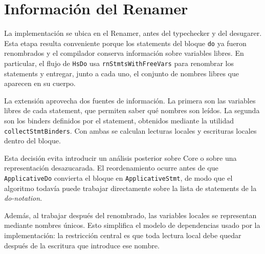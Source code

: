
\section{Información del Renamer}

La implementación se ubica en el Renamer, antes del typechecker y del desugarer. Esta etapa resulta conveniente porque los statements del bloque \texttt{do} ya fueron renombrados y el compilador conserva información sobre variables libres. En particular, el flujo de \texttt{HsDo} usa \texttt{rnStmtsWithFreeVars} para renombrar los statements y entregar, junto a cada uno, el conjunto de nombres libres que aparecen en su cuerpo.

La extensión aprovecha dos fuentes de información. La primera son las variables libres de cada statement, que permiten saber qué nombres son leídos. La segunda son los binders definidos por el statement, obtenidos mediante la utilidad \texttt{collectStmtBinders}. Con ambas se calculan lecturas locales y escrituras locales dentro del bloque.

Esta decisión evita introducir un análisis posterior sobre Core o sobre una representación desazucarada. El reordenamiento ocurre antes de que \texttt{ApplicativeDo} convierta el bloque en \texttt{ApplicativeStmt}, de modo que el algoritmo todavía puede trabajar directamente sobre la lista de statements de la \textit{do-notation}.

Además, al trabajar después del renombrado, las variables locales se representan mediante nombres únicos. Esto simplifica el modelo de dependencias usado por la implementación: la restricción central es que toda lectura local debe quedar después de la escritura que introduce ese nombre.
